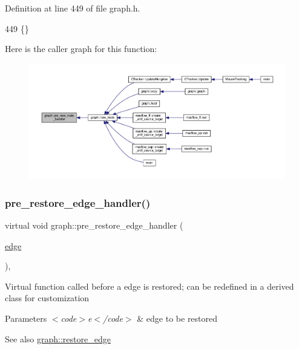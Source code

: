 Definition at line 449 of file graph.\+h.


\begin{DoxyCode}
449 \{\}
\end{DoxyCode}
Here is the caller graph for this function\+:
\nopagebreak
\begin{figure}[H]
\begin{center}
\leavevmode
\includegraphics[width=350pt]{classgraph_afb7606eaa8d673b6599af24437c0546c_icgraph}
\end{center}
\end{figure}
\mbox{\label{classgraph_a569d227d9f4914278a143d52139e3303}} 
\subsubsection{\texorpdfstring{pre\+\_\+restore\+\_\+edge\+\_\+handler()}{pre\_restore\_edge\_handler()}}
{\footnotesize\ttfamily virtual void graph\+::pre\+\_\+restore\+\_\+edge\+\_\+handler (\begin{DoxyParamCaption}\item[{\mbox{\hyperlink{classedge}{edge}}}]{ }\end{DoxyParamCaption})\hspace{0.3cm}{\ttfamily [inline]}, {\ttfamily [virtual]}}

Virtual function called before a edge is restored; can be redefined in a derived class for customization


\begin{DoxyParams}{Parameters}
{\em $<$code$>$e$<$/code$>$} & edge to be restored \\
\hline
\end{DoxyParams}
\begin{DoxySeeAlso}{See also}
\mbox{\hyperlink{classgraph_a2e5426682a0897b9f9104b019970bedc}{graph\+::restore\+\_\+edge}} 
\end{DoxySeeAlso}


